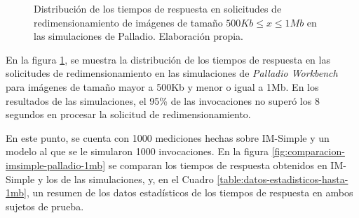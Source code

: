 \hspace{-2.0cm}
\begin{figure}
\caption[Distribución de los tiempos de respuesta en solicitudes de redimensionamiento de imágenes de tamaño $500Kb \leq x \leq 1Mb$ en las simulaciones de Palladio]{Distribución de los tiempos de respuesta en solicitudes de redimensionamiento de imágenes de tamaño $500Kb \leq x \leq 1Mb$ en las simulaciones de Palladio. Elaboración propia.}
\label{fig:distribucion-simulacion-imagenes-hasta-1mb}
\end{figure}

En la figura \ref{fig:distribucion-simulacion-imagenes-hasta-1mb}, se muestra la distribución de los tiempos de respuesta en las solicitudes de redimensionamiento en las simulaciones de \emph{Palladio Workbench} para imágenes de tamaño mayor a 500Kb y menor o igual a 1Mb. En los resultados de las simulaciones, el 95\% de las invocaciones no superó los 8 segundos en procesar la solicitud de redimensionamiento.

En este punto, se cuenta con 1000 mediciones hechas sobre IM-Simple y un modelo al que se le simularon 1000 invocaciones. En la figura \ref{fig:comparacion-imsimple-palladio-1mb} se comparan los tiempos de respuesta obtenidos en IM-Simple y los de las simulaciones, y, en el Cuadro \ref{table:datos-estadisticos-hasta-1mb}, un resumen de los datos estadísticos de los tiempos de respuesta en ambos sujetos de prueba.

